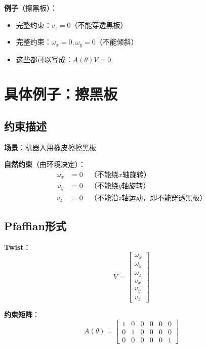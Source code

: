 \documentclass[12pt,a4paper]{article}
\begin{document}
\textbf{例子}（擦黑板）：
\begin{itemize}
\item 完整约束：$v_z = 0$（不能穿透黑板）
\item 完整约束：$\omega_x = 0, \omega_y = 0$（不能倾斜）
\item 这些都可以写成：$A(\theta)V = 0$
\end{itemize}

\section{具体例子：擦黑板}

\subsection{约束描述}

\textbf{场景}：机器人用橡皮擦擦黑板

\textbf{自然约束}（由环境决定）：
\begin{align}
\omega_x &= 0 \quad \text{（不能绕$x$轴旋转）} \\
\omega_y &= 0 \quad \text{（不能绕$y$轴旋转）} \\
v_z &= 0 \quad \text{（不能沿$z$轴运动，即不能穿透黑板）}
\end{align}

\subsection{Pfaffian形式}

\textbf{Twist}：
\begin{equation}
V = \begin{bmatrix} \omega_x \\ \omega_y \\ \omega_z \\ v_x \\ v_y \\ v_z \end{bmatrix}
\end{equation}

\textbf{约束矩阵}：
\begin{equation}
A(\theta) = \begin{bmatrix}
1 & 0 & 0 & 0 & 0 & 0 \\
0 & 1 & 0 & 0 & 0 & 0 \\
0 & 0 & 0 & 0 & 0 & 1
\end{bmatrix}
\end{equation}
\end{document}
